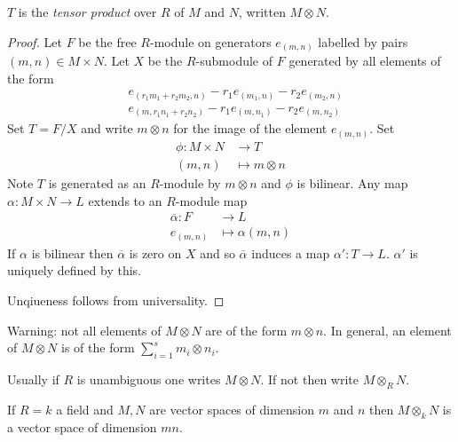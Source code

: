 \documentclass[a4paper]{article}
\begin{document}
\begin{definition}
  \(T\) is the \emph{tensor product} over \(R\) of \(M\) and \(N\), written \(M \otimes N\).
\end{definition}

\begin{proof}
  Let \(F\) be the free \(R\)-module on generators \(e_{(m, n)}\) labelled by pairs \((m, n) \in M \times N\). Let \(X\) be the \(R\)-submodule of \(F\) generated by all elements of the form
  \begin{align*}
    & e_{(r_1m_1 + r_2m_2, n)} - r_1 e_{(m_1, n)} - r_2 e_{(m_2, n)} \\
    & e_{(m, r_1n_1 + r_2n_2)} - r_1 e_{(m, n_1)} - r_2 e_{(m, n_2)}
  \end{align*}
  Set \(T = F/X\) and write \(m \otimes n\) for the image of the element \(e_{(m, n)}\). Set
  \begin{align*}
    \phi: M \times N &\to T \\
    (m, n) &\mapsto m \otimes n
  \end{align*}
  Note \(T\) is generated as an \(R\)-module by \(m \otimes n\) and \(\phi\) is bilinear. Any map \(\alpha: M \times N \to L\) extends to an \(R\)-module map
  \begin{align*}
    \overline \alpha: F &\to L \\
    e_{(m, n)} &\mapsto \alpha(m, n)
  \end{align*}
  If \(\alpha\) is bilinear then \(\overline \alpha\) is zero on \(X\) and so \(\overline \alpha\) induces a map \(\alpha': T \to L\). \(\alpha'\) is uniquely defined by this.

  Unqiueness follows from universality.
\end{proof}

Warning: not all elements of \(M \otimes N\) are of the form \(m \otimes n\). In general, an element of \(M \otimes N\) is of the form \(\sum_{i = 1}^s m_i \otimes n_i\).

Usually if \(R\) is unambiguous one writes \(M \otimes N\). If not then write \(M \otimes_R N\).

\begin{eg}
  If \(R = k\) a field and \(M, N\) are vector spaces of dimension \(m\) and \(n\) then \(M \otimes_k N\) is a vector space of dimension \(mn\).
\end{eg}
\end{document}
